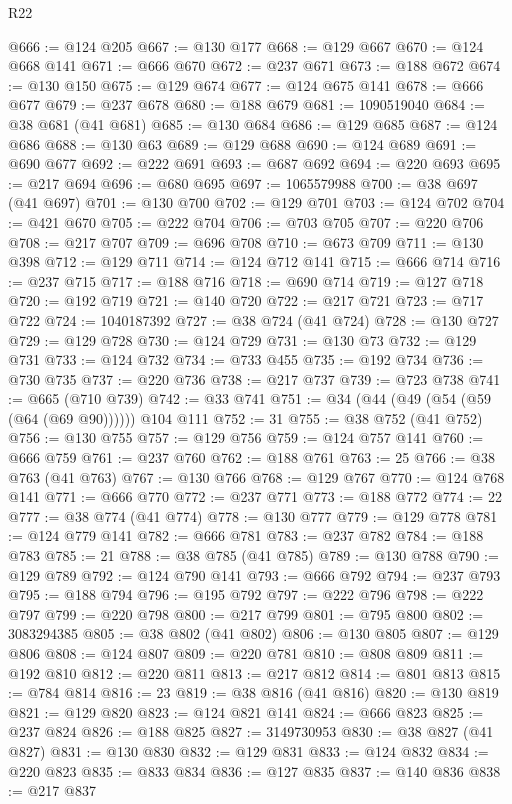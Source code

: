 \begin{lexlean}{R22}
\begin{coremodule}
@666 := @124 @205
@667 := @130 @177
@668 := @129 @667
@670 := @124 @668 @141
@671 := @666 @670
@672 := @237 @671
@673 := @188 @672
@674 := @130 @150
@675 := @129 @674
@677 := @124 @675 @141
@678 := @666 @677
@679 := @237 @678
@680 := @188 @679
@681 := 1090519040
@684 := @38 @681 (@41 @681)
@685 := @130 @684
@686 := @129 @685
@687 := @124 @686
@688 := @130 @63
@689 := @129 @688
@690 := @124 @689
@691 := @690 @677
@692 := @222 @691
@693 := @687 @692
@694 := @220 @693
@695 := @217 @694
@696 := @680 @695
@697 := 1065579988
@700 := @38 @697 (@41 @697)
@701 := @130 @700
@702 := @129 @701
@703 := @124 @702
@704 := @421 @670
@705 := @222 @704
@706 := @703 @705
@707 := @220 @706
@708 := @217 @707
@709 := @696 @708
@710 := @673 @709
@711 := @130 @398
@712 := @129 @711
@714 := @124 @712 @141
@715 := @666 @714
@716 := @237 @715
@717 := @188 @716
@718 := @690 @714
@719 := @127 @718
@720 := @192 @719
@721 := @140 @720
@722 := @217 @721
@723 := @717 @722
@724 := 1040187392
@727 := @38 @724 (@41 @724)
@728 := @130 @727
@729 := @129 @728
@730 := @124 @729
@731 := @130 @73
@732 := @129 @731
@733 := @124 @732
@734 := @733 @455
@735 := @192 @734
@736 := @730 @735
@737 := @220 @736
@738 := @217 @737
@739 := @723 @738
@741 := @665 (@710 @739)
@742 := @33 @741
@751 := @34 (@44 (@49 (@54 (@59 (@64 (@69 @90)))))) @104 @111
@752 := 31
@755 := @38 @752 (@41 @752)
@756 := @130 @755
@757 := @129 @756
@759 := @124 @757 @141
@760 := @666 @759
@761 := @237 @760
@762 := @188 @761
@763 := 25
@766 := @38 @763 (@41 @763)
@767 := @130 @766
@768 := @129 @767
@770 := @124 @768 @141
@771 := @666 @770
@772 := @237 @771
@773 := @188 @772
@774 := 22
@777 := @38 @774 (@41 @774)
@778 := @130 @777
@779 := @129 @778
@781 := @124 @779 @141
@782 := @666 @781
@783 := @237 @782
@784 := @188 @783
@785 := 21
@788 := @38 @785 (@41 @785)
@789 := @130 @788
@790 := @129 @789
@792 := @124 @790 @141
@793 := @666 @792
@794 := @237 @793
@795 := @188 @794
@796 := @195 @792
@797 := @222 @796
@798 := @222 @797
@799 := @220 @798
@800 := @217 @799
@801 := @795 @800
@802 := 3083294385
@805 := @38 @802 (@41 @802)
@806 := @130 @805
@807 := @129 @806
@808 := @124 @807
@809 := @220 @781
@810 := @808 @809
@811 := @192 @810
@812 := @220 @811
@813 := @217 @812
@814 := @801 @813
@815 := @784 @814
@816 := 23
@819 := @38 @816 (@41 @816)
@820 := @130 @819
@821 := @129 @820
@823 := @124 @821 @141
@824 := @666 @823
@825 := @237 @824
@826 := @188 @825
@827 := 3149730953
@830 := @38 @827 (@41 @827)
@831 := @130 @830
@832 := @129 @831
@833 := @124 @832
@834 := @220 @823
@835 := @833 @834
@836 := @127 @835
@837 := @140 @836
@838 := @217 @837

\end{coremodule}
\end{lexlean}

